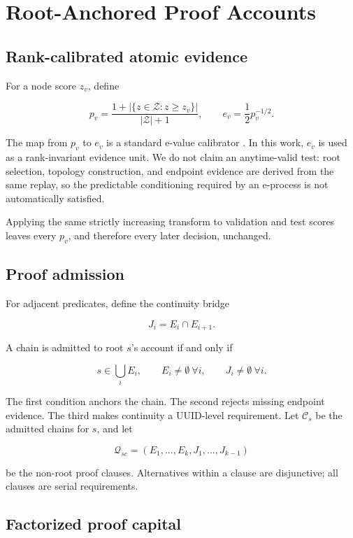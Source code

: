 \documentclass[runningheads]{llncs}
\begin{document}
\section{Root-Anchored Proof Accounts}

\subsection{Rank-calibrated atomic evidence}

For a node score \(z_v\), define

\[
p_v=
\frac{1+|\{z\in\mathcal Z:z\ge z_v\}|}
{|\mathcal Z|+1},
\qquad
e_v=\frac{1}{2}p_v^{-1/2}.
\]

The map from \(p_v\) to \(e_v\) is a standard e-value calibrator \cite{vovk2021evalues}. In this work, \(e_v\) is used as a rank-invariant evidence unit. We do not claim an anytime-valid test: root selection, topology construction, and endpoint evidence are derived from the same replay, so the predictable conditioning required by an e-process is not automatically satisfied.

Applying the same strictly increasing transform to validation and test scores leaves every \(p_v\), and therefore every later decision, unchanged.

\subsection{Proof admission}

For adjacent predicates, define the continuity bridge

\[
J_i=E_i\cap E_{i+1}.
\]

A chain is admitted to root \(s\)'s account if and only if

\[
s\in\bigcup_i E_i,\qquad
E_i\ne\emptyset\ \forall i,\qquad
J_i\ne\emptyset\ \forall i.
\]

The first condition anchors the chain. The second rejects missing endpoint evidence. The third makes continuity a UUID-level requirement. Let \(\mathcal C_s\) be the admitted chains for \(s\), and let

\[
\mathcal Q_{sc}=(E_1,\ldots,E_k,J_1,\ldots,J_{k-1})
\]

be the non-root proof clauses. Alternatives within a clause are disjunctive; all clauses are serial requirements.

\subsection{Factorized proof capital}
\end{document}
